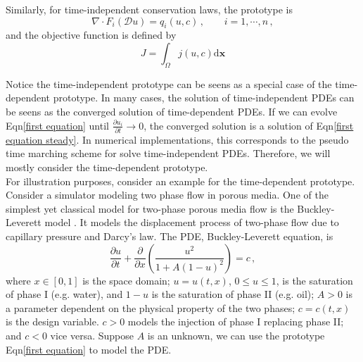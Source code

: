 \documentclass[a4paper,onecolumn]{article}
\theoremstyle{remark}
\begin{document}
\noindent Similarly, for time-independent conservation laws, the prototype is
\begin{equation}
    \nabla \cdot 
    F_i(\mathcal{D} u) 
    = q_i(u,c)\,, \qquad i=1,\cdots, n\,,
    \label{first equation steady}
\end{equation}
and the objective function is defined by
\begin{equation}
    J = \int_\Omega j(u,c) \textrm{d}\mathbf{x}
\end{equation}

\noindent Notice the time-independent prototype can be seens as a special case 
of the time-dependent prototype. In many cases, the solution of time-independent PDEs
can be seens as the converged solution of time-dependent PDEs. If we can evolve 
Eqn\eqref{first equation} until $\frac{\partial u_i}{\partial t}\rightarrow 0$,
the converged solution is a solution of Eqn\eqref{first equation steady}.
In numerical implementations, this corresponds to the pseudo time marching scheme
for solve time-independent PDEs. Therefore, we will mostly consider the time-dependent 
prototype.\\

\noindent For illustration purposes, 
consider an example for the time-dependent prototype. Consider 
a simulator modeling two phase flow in porous media.
One of the simplest yet classical model for two-phase porous media flow is the Buckley-Leverett model \cite{Buckley Leverett, Reservoir Simulation Book}. 
It models the displacement process of two-phase flow due to capillary pressure and Darcy's law.
The PDE, Buckley-Leverett equation, is
\begin{equation}
    \frac{\partial u}{\partial t} + \frac{\partial}{\partial x} \left(\frac{u^2}{1+A(1-u)^2}\right) = c\,,
    \label{Buck-Lev eqn}
\end{equation}
where $x\in[0,1]$ is the space domain;
$u = u(t,x)$, $0\le u\le 1$, is the saturation of phase I (e.g. water), 
and $1-u$ is the saturation of phase II (e.g. oil);
$A>0$ is a parameter dependent on the physical property of the two phases;
$c=c(t,x)$ is the design variable. $c>0$ models the injection of phase I replacing phase II; and $c<0$ vice versa.
Suppose $A$ is an unknown, we can use the prototype Eqn\eqref{first equation} to 
model the PDE.\\
\end{document}
